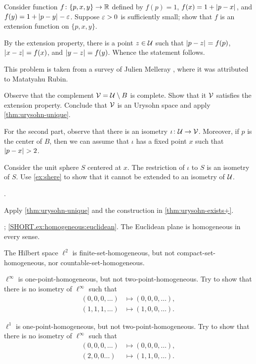 Consider function $f\colon\{p,x,y\}\to\mathbb{R}$ defined by $f(p)=1$, $f(x)=1+\dist{p}{x}{}$, and $f(y)=1+\dist{p}{y}{}-\eps$.
Suppose $\varepsilon>0$ is sufficiently small;
show that $f$ is an extension function on $\{p,x,y\}$.

By the extension property, there is a point $z\in \mathcal{U}$ such that $\dist{p}{z}{}=f(p)$, $\dist{x}{z}{}=f(x)$, and $\dist{y}{z}{}=f(y)$.
Whence the statement follows.

 This problem is taken from a survey of Julien Melleray
 \cite[Prop. 4.3]{melleray}, where it was attributed to Matatyahu Rubin.


Observe that the complement $\mathcal{V}=\mathcal{U}\setminus B$ is complete.
Show that it $\mathcal{V}$ satisfies the extension property.
Conclude that $\mathcal{V}$ is an Urysohn space and apply \ref{thm:urysohn-unique}.

For the second part, observe that there is an isometry $\iota\colon\mathcal{U}\to \mathcal{V}$.
Moreover, if $p$ is the center of $B$, then we can assume that $\iota$ has a fixed point $x$ such that $\dist{p}{x}{}>2$.

Consider the unit sphere $S$ centered at $x$.
The restriction of $\iota$ to $S$ is an isometry of $S$.
Use \ref{ex:shere} to show that it cannot be extended to an isometry of $\mathcal{U}$.

 \cite[Sec. 4.4]{melleray}.

Apply \ref{thm:urysohn-unique} and the construction in \ref{thm:urysohn-exists+}.

\parbf{\ref{ex:homogeneous}}; \ref{SHORT.ex:homogeneous:euclidean}.
The Euclidean plane is homogeneous in every sense.

The Hilbert space $\ell^2$ is finite-set-homogeneous, but not compact-set-homogeneous, nor countable-set-homogeneous.

$\ell^\infty$ is one-point-homogeneous, but not two-point-homogeneous.
Try to show that there is no isometry of $\ell^\infty$ such that
\begin{align*}
(0,0,0,\dots)&\mapsto (0,0,0,\dots),
\\
(1,1,1,\dots)&\mapsto (1,0,0,\dots).
\end{align*}

$\ell^1$ is one-point-homogeneous, but not two-point-homogeneous.
Try to show that there is no isometry of $\ell^\infty$ such that
\begin{align*}
(0,0,0,\dots)&\mapsto (0,0,0,\dots),
\\
(2,0,0\dots)&\mapsto (1,1,0,\dots).
\end{align*}

